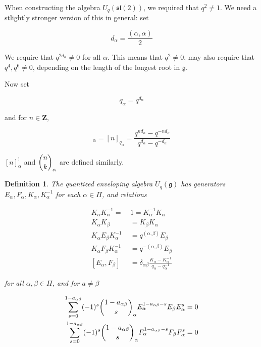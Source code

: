 \documentclass[]{article}
\newtheorem{defn}[theorem]{Definition}
\newcommand{\sll}{\mathfrak{sl}}
\numberwithin{equation}{subsection}
\begin{document}
        When constructing the algebra $U_q(\sll(2))$, we required that $q^2 \neq 1$. We need a stlightly stronger version of this in general: set

        \begin{equation}
            d_\alpha = \frac{(\alpha, \alpha)}{2}
        \end{equation}

        We require that $q^{2d_{\alpha}} \neq 0$ for all $\alpha$. This means
        that $q^2 \neq 0$, may also require that $q^4, q^6 \neq 0$, depending
        on the length of the longest root in $\mathfrak{g}$.

        Now set 

        \begin{equation}
            q_\alpha = q^{d_\alpha}
        \end{equation}

        and for $n \in \mathbf{Z}$,

        \begin{equation}
            [n]_\alpha = [n]_{q_\alpha} = \frac{q^{nd_\alpha} - q^{-nd_\alpha}}{q^{d_\alpha} - q^{-d_\alpha}}
        \end{equation}

        $[n]_\alpha^!$ and $\dbinom{n}{k}_\alpha$ are defined similarly.

        \begin{defn}
            The quantized enveloping algebra $U_q(\mathfrak{g})$ has generators $E_\alpha, F_\alpha, K_\alpha, K_\alpha^{-1}$ for each $\alpha \in \Pi$, and relations

            \begin{align}
                K_\alpha K_\alpha^{-1} =\ &1  = K_\alpha^{-1}K_\alpha \\
                K_\alpha K_\beta &= K_\beta K_\alpha \\
                K_\alpha E_\beta K_\alpha^{-1} &= q^{(\alpha, \beta)} E_\beta \\
                K_\alpha F_\beta K_\alpha^{-1} &= q^{-(\alpha, \beta)} E_\beta \\
                [E_\alpha, F_\beta] &= \delta_{\alpha\beta} \frac{K_\alpha - K_\alpha^{-1}}{ q_\alpha - q_\alpha^{-1}} 
            \end{align}

            for all $\alpha, \beta \in \Pi$, and for $a \neq \beta$

            \begin{align}
                \sum_{s=0}^{1-a_{\alpha\beta}} (-1)^s \dbinom{1-a_{\alpha\beta}}{s}_\alpha E_\alpha^{1-a_{\alpha\beta} - s} E_\beta E_\alpha^s  &= 0 \\
                \sum_{s=0}^{1-a_{\alpha\beta}} (-1)^s \dbinom{1-a_{\alpha\beta}}{s}_\alpha F_\alpha^{1-a_{\alpha\beta} - s} F_\beta F_\alpha^s  &= 0 
            \end{align}
        \end{defn}
\end{document}
